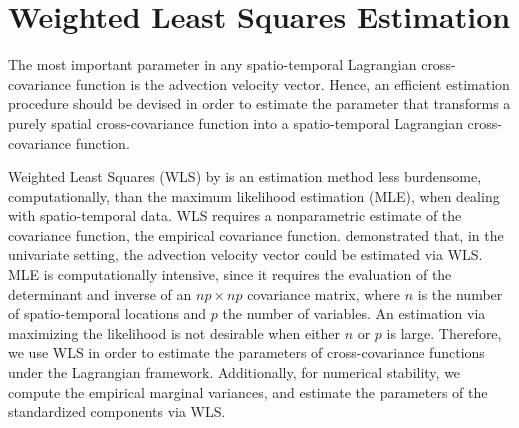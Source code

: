 \documentclass[12pt]{article}
\newcommand{\0}{\mathbf{0}}
\begin{document}
\section{Weighted Least Squares Estimation}\label{sec:estimation}

The most important parameter in any spatio-temporal Lagrangian cross-covariance function is the advection velocity vector. Hence, an efficient estimation procedure should be devised in order to estimate the parameter that transforms a purely spatial cross-covariance function into a spatio-temporal Lagrangian cross-covariance function.

Weighted Least Squares (WLS) by \citet{cressie1985fitting} is an estimation method less burdensome, computationally, than the maximum likelihood estimation (MLE), when dealing with spatio-temporal data. WLS requires a nonparametric estimate of the covariance function, the empirical covariance function. \citet{gneiting2006geostatistical} demonstrated that, in the univariate setting, the advection velocity vector could be estimated via WLS. MLE is computationally intensive, since it requires the evaluation of the determinant and inverse of an $np\times np$ covariance matrix, where $n$ is the number of spatio-temporal locations and $p$ the number of variables. An estimation via maximizing the likelihood is not desirable when either $n$ or $p$ is large. Therefore, we use WLS in order to estimate the parameters of cross-covariance functions under the Lagrangian framework. Additionally, for numerical stability, we compute the empirical marginal variances, and estimate the parameters of the standardized components via WLS.
\end{document}
